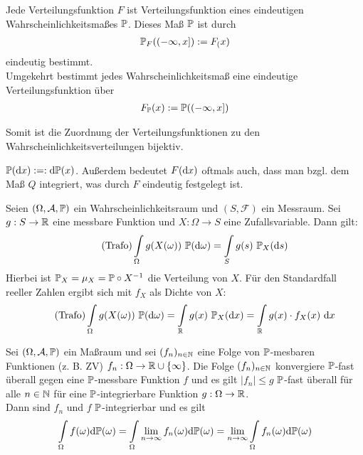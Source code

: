 \begin{satz}[Korrespondenzsatz]\label{satzKorrespondenzsatz}\enter
	Jede Verteilungsfunktion $F$ ist Verteilungsfunktion eines eindeutigen Wahrscheinlichkeitsmaßes $\P$. 
	Dieses Maß $\P$ ist durch
	\begin{align*}
		\P_F((-\infty,x]):=F_(x)
	\end{align*}
	eindeutig bestimmt.\\
	Umgekehrt bestimmt jedes Wahrscheinlichkeitsmaß eine eindeutige Verteilungsfunktion über
	\begin{align*}
		F_{\P}(x):=\P((-\infty,x])
	\end{align*}

	Somit ist die Zuordnung der Verteilungsfunktionen zu den Wahrscheinlichkeitsverteilungen bijektiv. 
\end{satz}

\begin{notation}
	$\P(\d x):=:\d\P(x)$. 
	Außerdem bedeutet $F(\d x)$ oftmals auch, dass man bzgl. dem Maß $Q$ integriert, was durch $F$ eindeutig festgelegt ist.
\end{notation}

\begin{satz}[Transformationssatz]\label{satzTransformationssatz}\enter
	Seien $(\Omega,\A,\P)$ ein Wahrscheinlichkeitsraum und $(S,\mathcal{F})$ ein Messraum.
	Sei $g:S\to\R$ eine messbare Funktion und $X:\Omega\to S$ eine Zufallsvariable. 
	Dann gilt:
	\begin{align}\label{eqTrafo}\tag{Trafo}
		\int\limits_\Omega g(X(\omega))~\P(\d\omega)
		=\int\limits_S g(s)~\P_X(\d s)
	\end{align}
	Hierbei ist $\P_X=\mu_X=\P\circ X^{-1}$ die Verteilung von $X$.
	Für den Standardfall reeller Zahlen ergibt sich mit $f_X$ als Dichte von $X$:
	\begin{align}\label{eqTrafoR}\tag{Trafo}
		\int\limits_\Omega g(X(\omega))~\P(\d\omega)
		=\int\limits_\R g(x)~\P_X(\d x)
		=\int\limits_\R g(x)\cdot f_X(x)\ds x
	\end{align}
\end{satz}

\begin{satz}\label{satzMajorisierteKonvergenz}\enter
	Sei $(\Omega,\A,\P)$ ein Maßraum und sei $(f_n)_{n\in\N}$ eine Folge von $\P$-mesbaren Funktionen (z. B. ZV) $f_n:\Omega\to\R\cup\lbrace\infty\rbrace$. 
	Die Folge $(f_n)_{n\in\N}$ konvergiere $\P$-fast überall gegen eine $\P$-messbare Funktion $f$ und es gilt $|f_n|\leq g$ $\P$-fast überall für alle $n\in\N$ für eine $\P$-integrierbare Funktion $g:\Omega\to\R$.\\
	Dann sind $f_n$ und $f$ $\P$-integrierbar und es gilt
	\begin{align*}
		\int\limits_\Omega f(\omega)\d\P(\omega)=\int\limits_\Omega \limn f_n(\omega)\d\P(\omega)
		=\limn\int\limits_\Omega f_n(\omega)\d\P(\omega)
	\end{align*}
\end{satz}

